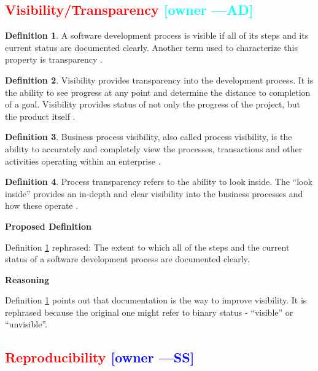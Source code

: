 \documentclass[letterpaper,cleveref]{lipics-v2019}
\newcommand{\authornote}[3]{\textcolor{#1}{[#3 ---#2]}}
\newcommand{\authornote}[3]{}
\newcommand{\wss}[1]{\authornote{blue}{SS}{#1}} %
\newcommand{\ad}[1]{\authornote{cyan}{AD}{#1}} %
\newcommand{\notdone}[1]{\textcolor{red}{#1}}
\theoremstyle{definition}
\newtheorem{defn}{Definition}
\begin{document}
\subsection{\notdone{Visibility/Transparency} \ad{owner}}

\begin{defn}
	\label{VisibilitySelected}
	A software development process is visible if all of its steps and its current
	status are documented clearly. Another term used to characterize this property
	is transparency \citep{ghezzi1991fundamentals}.
\end{defn}

\begin{defn}
	Visibility provides transparency into the development process. It is the ability
	to see progress at any point and determine the distance to completion of a goal.
	Visibility provides status of not only the progress of the project, but the
	product itself \citep{GSA2019}.
\end{defn}

\begin{defn}
	Business process visibility, also called process visibility, is the ability to
	accurately and completely view the processes, transactions and other activities
	operating within an enterprise \citep{Rouse2013}.
\end{defn}

\begin{defn}
	Process transparency refers to the ability to look inside. The “look inside”
	provides an in-depth and clear visibility into the business processes and how
	these operate \citep{PRIME2019}.
\end{defn}

\noindent \textbf{Proposed Definition} 

Definition \ref{VisibilitySelected} rephrased: The extent to which all of the
steps and the current status of a software development process are documented
clearly.

\noindent \textbf{Reasoning}

Definition \ref{VisibilitySelected} points out that documentation is the way to
improve visibility. It is
rephrased because the original one might refer to binary status - ``visible'' or
``unvisible''.

\subsection{\notdone{Reproducibility} \wss{owner}}
\end{document}

